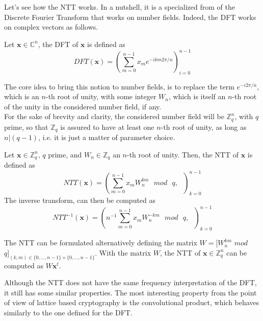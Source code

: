 Let's see how the NTT works. In a nutshell, it is a specialized from of the Discrete Fourier Transform that works on number fields. Indeed, the DFT works on complex vectors as follows.

\begin{definition}
Let $\mathbf{x}\in\mathbb{C}^n$, the DFT of $\mathbf{x}$ is defined as
\begin{equation*}
DFT(\mathbf{x})=\left(\sum_{m=0}^{n-1}x_me^{-ikm2\pi/n} \right)_{i=0}^{n-1}
\end{equation*}
\end{definition}

The core idea to bring this notion to number fields, is to replace the term $e^{-i2\pi/n}$, which is an $n$-th root of unity, with some integer $W_n$, which is itself an $n$-th root of the unity in the considered number field, if any.\\
For the sake of brevity and clarity, the considered number field will be $\mathbb{Z}_q^n$, with $q$ prime, so that $\mathbb{Z}_q$ is assured to have at least one $n$-th root of unity, as long as $n|(q-1)$, i.e. it is just a matter of parameter choice.

\begin{definition}[NTT]
Let $\mathbf{x}\in\mathbb{Z}_q^n$, $q$ prime, and $W_n\in\mathbb{Z}_q$ an $n$-th root of unity. Then, the NTT of $\mathbf{x}$ is defined as
\begin{equation*}
NTT(\mathbf{x})=\left(\sum_{m=0}^{n-1}x_mW_n^{km}\text{ }mod\text{ }q,\text{ }\right)_{k=0}^{n-1}  
\end{equation*}
The inverse transform, can then be computed as
\begin{equation*}
NTT^{-1}(\mathbf{x})=\left(n^{-1}\sum_{m=0}^{n-1}x_mW_n^{-km}\text{ }mod\text{ }q,\text{ }\right)_{k=0}^{n-1}
\end{equation*} 
\end{definition}

\begin{remark}
The NTT can be formulated alternatively defining the matrix $W=[W_n^{km}$ $mod$ $q]_{(k,m)\in\{0,\ldots,n-1\}\times\{0,\ldots,n-1\}}$. With the matrix $W$, the NTT of $\mathbf{x}\in\mathbb{Z}_q^n$ can be computed as $W\mathbf{x}^t$.
\end{remark}

Although the NTT does not have the same frequency interpretation of the DFT, it still has some similar properties. The most interesting property from the point of view of lattice based cryptography is the convolutional product, which behaves similarly to the one defined for the DFT.

